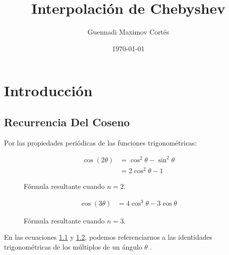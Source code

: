 \documentclass[12pt,letterpaper]{article}
\author{Guennadi Maximov Cortés}
\date{\today}
\title{Interpolación de Chebyshev}
\begin{document}
	\maketitle
	\tableofcontents
	\newpage

	\chapter{Introducción} %
		\section{Recurrencia Del Coseno} %

		Por las propiedades periódicas de las funciones trigonométricas:

			\begin{figure}
				\begin{center}
					\begin{equation}
						\begin{split}
							\cos\left(2\theta\right) &= \cos^{2}\theta - \sin^2 \theta\\
							&= 2\cos^{2} \theta - 1
						\end{split}
					\end{equation}
				\end{center}
				\label{eq1:cos1}
				\caption{Fórmula resultante cuando ${n=2}$.}
			\end{figure}

			\begin{figure}
				\begin{center}
					\begin{equation}
						\begin{split}
						\cos \left(3\theta\right) &= 4\cos^3 \theta - 3\cos \theta
						\end{split}
					\end{equation}
				\end{center}
				\label{eq2:cos1}
				\caption{Fórmula resultante cuando ${n=3}$.}
			\end{figure}

			En las ecuaciones \ref{eq1:cos1} y \ref{eq2:cos1}, podemos referenciarnos
			a las identidades trigonométricas de los múltiplos de un ángulo ${\theta}$ \cite{TRIGID:1}.
\end{document}
